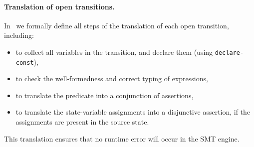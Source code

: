 \documentclass[smallcondensed]{svjour3}
\newcommand{\TODO}[1]{\textcolor{red}{\textbf{[TODO:#1]}}}
\newcommand{\Post}{\symb{Post}}
\begin{document}



\paragraph{Translation of open transitions.}
In~\cite{Avocs-RR} we formally define all steps of the translation of each
open transition, including:
%
\begin{itemize}
	\item to collect all variables in the transition, and declare them (using \texttt{declare-const}),
	\item to check the well-formedness and correct typing of expressions,
	\item to translate the predicate into a conjunction of assertions,
	\item to translate the state-variable
	assignments into a disjunctive assertion, if the assignments are present in the source state.
\end{itemize}
%
This translation ensures that no runtime error will occur
in the SMT engine.
\end{document}
